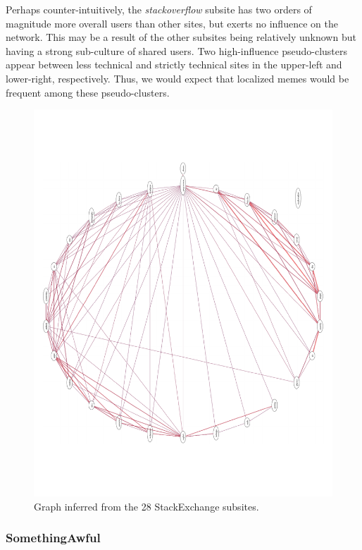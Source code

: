 \documentclass{article} %
\begin{document}
Perhaps counter-intuitively, the \textit{stackoverflow} subsite has two orders of magnitude more overall users than other sites, but exerts no influence on the network. This may be a result of the other subsites being relatively unknown but having a strong sub-culture of shared users. Two high-influence pseudo-clusters appear between less technical and strictly technical sites in the upper-left and lower-right, respectively. Thus, we would expect that localized memes would be frequent among these pseudo-clusters.

\begin{figure}[htb]
\centering
\includegraphics[width=\textwidth]{stackexchange.pdf}
\caption{Graph inferred from the 28 StackExchange subsites.}
\label{fig:reddit}
\end{figure}

\subsubsection{SomethingAwful}
\end{document}
